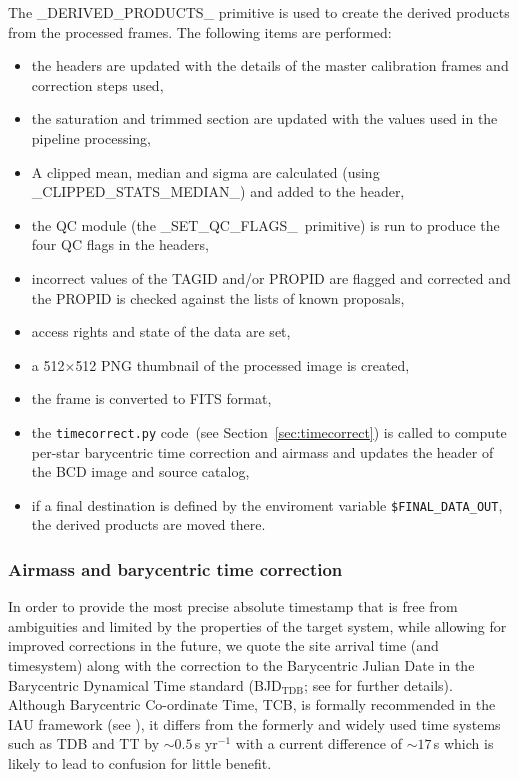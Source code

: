 \documentclass[twoside,11pt,nolof]{starlink}
\providecommand{\task}[1]{\textsf{#1}}
\providecommand{\Ast}{\texttt{timecorrect.py} code}
\providecommand{\rmn}[1] {\mathrm{#1}}
\begin{document}
The \task{\_DERIVED\_PRODUCTS\_} primitive is used to create the derived products from the processed frames. The
following items are performed:
\begin{itemize}
\item  the headers are updated with the details of the master calibration frames
   and correction steps used,
\item  the saturation and trimmed section are updated with the values used in
   the pipeline processing,
\item  A clipped mean, median and sigma are calculated (using
\task{\_CLIPPED\_STATS\_MEDIAN\_}) and added to the header,
\item  the QC module (the \task{\_SET\_QC\_FLAGS\_}\ primitive) is run to produce the four QC flags in the headers,
\item  incorrect values of the TAGID and/or PROPID are flagged and corrected
   and the PROPID is checked against the lists of known proposals,
\item  access rights and state of the data are set,
\item  a 512$\times$512 PNG thumbnail of the processed image is created,
\item  the frame is converted to FITS format,
\item  the \Ast\ (see Section~\ref{sec:timecorrect}) is called to compute per-star barycentric time
   correction and airmass and updates the header of the BCD image and
   source catalog,
\item  if a final destination is defined by the enviroment variable
   \texttt{\$FINAL\_DATA\_OUT}, the derived products are moved there.
\end{itemize}

\subsubsection{Airmass and barycentric time correction}
\protect\label{sec:timecorrect}


In order to provide the most precise absolute timestamp that is free from
ambiguities and limited by the properties of the target system, while allowing
for improved corrections in the future, we quote the site arrival time (and
timesystem) along with the correction to the Barycentric Julian Date in the
Barycentric Dynamical Time standard (BJD$_\rmn{TDB}$; see \cite{eastman2010} for
further details). Although Barycentric Co-ordinate Time, TCB, is formally
recommended in the IAU framework (see \cite{iers2010}), it differs from the
formerly and widely used time systems such as TDB and TT by
$\sim0.5$\,s yr$^{-1}$ with a current difference of $\sim17$\,s which is likely to
lead to confusion for little benefit.
\end{document}
